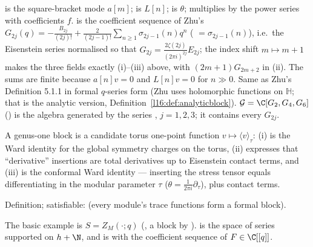 \begin{dictionary}
 is the square-bracket mode $a[m]$;  is $L[n]$;  is $\theta$; 
multiplies by the power series with coefficients $f$.  is the coefficient sequence of Zhu's
$G_{2j}(q) = -\frac{B_{2j}}{(2j)!} + \frac{2}{(2j-1)!}\sum_{n\ge1}\sigma_{2j-1}(n)q^n$ (
$=\sigma_{2j-1}(n)$), i.e.\ the Eisenstein series normalised so that $G_{2j} = \frac{2\zeta(2j)}{(2\pi i)^{2j}}E_{2j}$; the
index shift $m\mapsto m+1$ makes the three fields exactly (i)--(iii) above, with $(2m+1)G_{2m+2}$ in (ii). The  sums
are finite because $a[n]v = 0$ and $L[n]v = 0$ for $n\gg0$. Same as Zhu's Definition 5.1.1 in formal $q$-series form (Zhu
uses holomorphic functions on $\mathbb H$; that is the analytic version, Definition~\ref{l16:def:analyticblock}).
$\mathcal G = \C[G_2,G_4,G_6]$ () is the algebra generated by the series \allowbreak{},
$j = 1,2,3$; it contains every $G_{2j}$.
\end{dictionary}

\begin{physics}
A genus-one block is a candidate torus one-point function $v\mapsto\langle v\rangle_\tau$: (i) is the Ward identity for the
global symmetry charges on the torus, (ii) expresses that ``derivative'' insertions are total derivatives up to Eisenstein
contact terms, and (iii) is the conformal Ward identity --- inserting the stress tensor equals differentiating in the modular
parameter $\tau$ ($\theta = \frac1{2\pi i}\partial_\tau$), plus contact terms.
\end{physics}

\begin{status}
Definition; satisfiable: \allowbreak{} (every module's trace functions form a formal block).
\end{status}

The basic example is $S = Z_M(\cdot;q)$
(, a block by \allowbreak{}).  is the space of
series supported on $h+\N$, and  is  with the coefficient sequence of $F\in\C[[q]]$.

